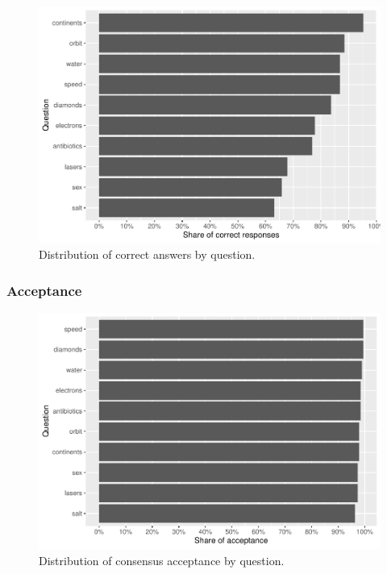 \documentclass[
  doc,floatsintext]{apa6}
\begin{document}
\begin{figure}
\centering
\includegraphics{output/figures/exp2-questions-knowledge.pdf}
\caption{\label{fig:exp2-questions-knowledge}Distribution of correct answers by question.}
\end{figure}

\subsubsection{Acceptance}\label{acceptance-1}



\begin{figure}
\centering
\includegraphics{output/figures/exp2-questions-acceptance.pdf}
\caption{\label{fig:exp2-questions-acceptance}Distribution of consensus acceptance by question.}
\end{figure}
\end{document}
